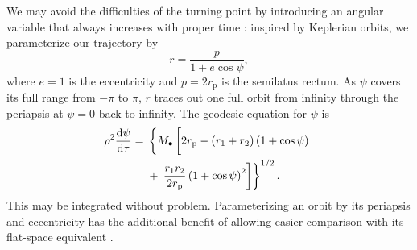 \documentclass[useAMS,usedcolumn,usegraphicx,usenatbib]{mn2e}
\newcommand{\sub}[1]{\ensuremath{_\mathrm{#1}}}
\newcommand{\dd}{\ensuremath{\mathrm{d}}}
\newcommand{\diff}[2]{\ensuremath{\frac{\dd {#1}}{\dd {#2}}}}
\begin{document}
We may avoid the difficulties of the turning point by introducing an angular variable that always increases with proper time \citep{Drasco2004}: inspired by Keplerian orbits, we parameterize our trajectory by
\begin{equation}
r = \frac{p}{1+e\cos\psi},
\end{equation}
where $e = 1$ is the eccentricity and $p = 2r\sub{p}$ is the semilatus rectum. As $\psi$ covers its full range from $-\pi$ to $\pi$, $r$ traces out one full orbit from infinity through the periapsis at $\psi = 0$ back to infinity. The geodesic equation for $\psi$ is
\begin{align}
\rho^2 \diff{\psi}{\tau} = {} & \left\{M_\bullet\left[2r\sub{p} - \left(r_1 + r_2\right)\left(1 + \cos\psi\right) \vphantom{\frac{r_1 r_2}{2r\sub{p}}} \right.\right. \nonumber \\*
 {} & + \left.\left. \frac{r_1 r_2}{2r\sub{p}}\left(1 + \cos\psi\right)^2\right]\right\}^{1/2}.
\end{align}
This may be integrated without problem. Parameterizing an orbit by its periapsis and eccentricity has the additional benefit of allowing easier comparison with its flat-space equivalent \citep{Gair2005}.
\end{document}
